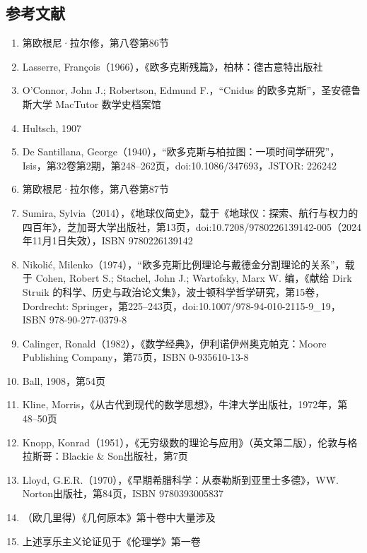 \subsection{参考文献}
\begin{enumerate}
\item 第欧根尼·拉尔修，第八卷第86节
\item Lasserre, François（1966），《欧多克斯残篇》，柏林：德古意特出版社
\item O'Connor, John J.; Robertson, Edmund F.，“Cnidus 的欧多克斯”，圣安德鲁斯大学 MacTutor 数学史档案馆
\item Hultsch, 1907
\item De Santillana, George（1940），“欧多克斯与柏拉图：一项时间学研究”，Isis，第32卷第2期，第248–262页，doi:10.1086/347693，JSTOR: 226242
\item 第欧根尼·拉尔修，第八卷第87节
\item Sumira, Sylvia（2014），《地球仪简史》，载于《地球仪：探索、航行与权力的四百年》，芝加哥大学出版社，第13页，doi:10.7208/9780226139142-005（2024年11月1日失效），ISBN 9780226139142
\item Nikolić, Milenko（1974），“欧多克斯比例理论与戴德金分割理论的关系”，载于 Cohen, Robert S.; Stachel, John J.; Wartofsky, Marx W. 编，《献给 Dirk Struik 的科学、历史与政治论文集》，波士顿科学哲学研究，第15卷，Dordrecht: Springer，第225–243页，doi:10.1007/978-94-010-2115-9\_19，ISBN 978-90-277-0379-8
\item Calinger, Ronald（1982），《数学经典》，伊利诺伊州奥克帕克：Moore Publishing Company，第75页，ISBN 0-935610-13-8
\item Ball, 1908，第54页
\item Kline, Morris，《从古代到现代的数学思想》，牛津大学出版社，1972年，第48–50页
\item Knopp, Konrad（1951），《无穷级数的理论与应用》（英文第二版），伦敦与格拉斯哥：Blackie & Son出版社，第7页
\item Lloyd, G.E.R.（1970），《早期希腊科学：从泰勒斯到亚里士多德》，W\.W. Norton出版社，第84页，ISBN 9780393005837
\item （欧几里得）《几何原本》第十卷中大量涉及
\item 上述享乐主义论证见于《伦理学》第一卷
\end{enumerate}